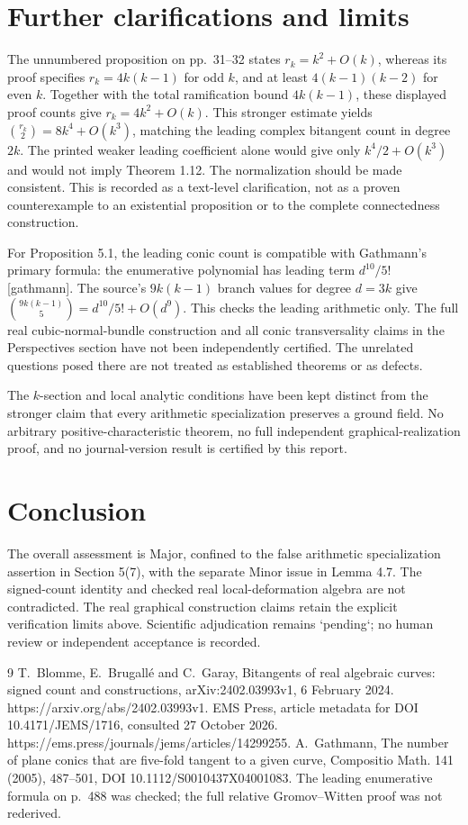 \documentclass[10pt]{article}
\begin{document}
\section*{Further clarifications and limits}
The unnumbered proposition on pp. 31–32 states \(r_k=k^2+O(k)\), whereas its proof specifies \(r_k=4k(k-1)\) for odd \(k\), and at least \(4(k-1)(k-2)\) for even \(k\). Together with the total ramification bound \(4k(k-1)\), these displayed proof counts give \(r_k=4k^2+O(k)\). This stronger estimate yields \(\binom{r_k}{2}=8k^4+O(k^3)\), matching the leading complex bitangent count in degree \(2k\). The printed weaker leading coefficient alone would give only \(k^4/2+O(k^3)\) and would not imply Theorem 1.12. The normalization should be made consistent. This is recorded as a text-level clarification, not as a proven counterexample to an existential proposition or to the complete connectedness construction.\par
For Proposition 5.1, the leading conic count is compatible with Gathmann’s primary formula: the enumerative polynomial has leading term \(d^{10}/5!\) [gathmann]. The source’s \(9k(k-1)\) branch values for degree \(d=3k\) give \(\binom{9k(k-1)}5=d^{10}/5!+O(d^9)\). This checks the leading arithmetic only. The full real cubic-normal-bundle construction and all conic transversality claims in the Perspectives section have not been independently certified. The unrelated questions posed there are not treated as established theorems or as defects.\par
The \(k\)-section and local analytic conditions have been kept distinct from the stronger claim that every arithmetic specialization preserves a ground field. No arbitrary positive-characteristic theorem, no full independent graphical-realization proof, and no journal-version result is certified by this report.\par
\section*{Conclusion}
The overall assessment is Major, confined to the false arithmetic specialization assertion in Section 5(7), with the separate Minor issue in Lemma 4.7. The signed-count identity and checked real local-deformation algebra are not contradicted. The real graphical construction claims retain the explicit verification limits above. Scientific adjudication remains `pending`; no human review or independent acceptance is recorded.\par
9 T. Blomme, E. Brugallé and C. Garay, Bitangents of real algebraic curves: signed count and constructions, arXiv:2402.03993v1, 6 February 2024. https://arxiv.org/abs/2402.03993v1. EMS Press, article metadata for DOI 10.4171/JEMS/1716, consulted 27 October 2026. https://ems.press/journals/jems/articles/14299255. A. Gathmann, The number of plane conics that are five-fold tangent to a given curve, Compositio Math. 141 (2005), 487–501, DOI 10.1112/S0010437X04001083. The leading enumerative formula on p. 488 was checked; the full relative Gromov–Witten proof was not rederived.\par
\end{document}
